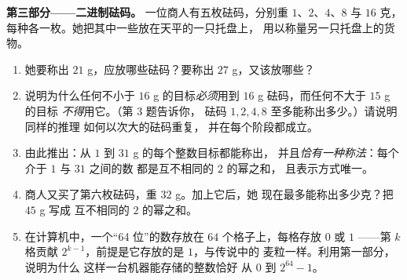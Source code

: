 \begin{problem}[{周末问题——等比数列求和
$1 + 2 + 4 + \dots + 2^{n-1} = 2^n - 1$，由一个著名传说通向
二进制数}]
\medskip
\noindent\textbf{第三部分——二进制砝码。}
一位商人有五枚砝码，分别重 $1$、$2$、$4$、$8$ 与 $16$ 克，
每种各一枚。她把其中一些放在天平的一只托盘上，
用以称量另一只托盘上的货物。
\begin{enumerate}[resume]
  \item 她要称出 $21$ g，应放哪些砝码？要称出
        $27$ g，又该放哪些？
  \item 说明为什么任何不小于 $16$ g 的目标\emph{必须}用到
        $16$ g 砝码，而任何不大于 $15$ g 的目标
        \emph{不得}用它。（第 3 题告诉你，
        砝码 $1, 2, 4, 8$ 至多能称出多少。）请说明同样的推理
        如何以次大的砝码重复，
        并在每个阶段都成立。
  \item 由此推出：从 $1$ 到 $31$ g 的每个整数目标都能称出，
        并且\emph{恰有一种称法}：每个介于 $1$ 与 $31$ 之间的数
        都是互不相同的 $2$ 的幂之和，
        且表示方式唯一。
  \item 商人又买了第六枚砝码，重 $32$ g。加上它后，她
        现在最多能称出多少克？把 $45$ g 写成
        互不相同的 $2$ 的幂之和。
  \item 在计算机中，一个“64 位”的数存放在 $64$
        个格子上，每格存放 $0$ 或 $1$ ——第 $k$
        格贡献 $2^{k-1}$，前提是它存放的是 $1$，与传说中的
        麦粒一样。利用第一部分，说明为什么
        这样一台机器能存储的整数恰好
        从 $0$ 到 $2^{64} - 1$。
\end{enumerate}
\end{problem}

